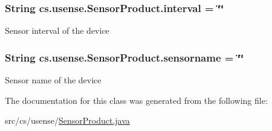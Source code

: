 \subsubsection[{interval}]{\setlength{\rightskip}{0pt plus 5cm}String cs.\+usense.\+Sensor\+Product.\+interval = \char`\"{}\char`\"{}\hspace{0.3cm}{\ttfamily [private]}}\label{classcs_1_1usense_1_1_sensor_product_aebd637f06a6f2c572317556062f3d471}
Sensor interval of the device \hypertarget{classcs_1_1usense_1_1_sensor_product_ac44fd4b06730b043d6d8e6f089699ee0}{}
\subsubsection[{sensorname}]{\setlength{\rightskip}{0pt plus 5cm}String cs.\+usense.\+Sensor\+Product.\+sensorname = \char`\"{}\char`\"{}\hspace{0.3cm}{\ttfamily [private]}}\label{classcs_1_1usense_1_1_sensor_product_ac44fd4b06730b043d6d8e6f089699ee0}
Sensor name of the device 

The documentation for this class was generated from the following file\+:\begin{DoxyCompactItemize}
\item 
src/cs/usense/\hyperlink{_sensor_product_8java}{Sensor\+Product.\+java}\end{DoxyCompactItemize}
